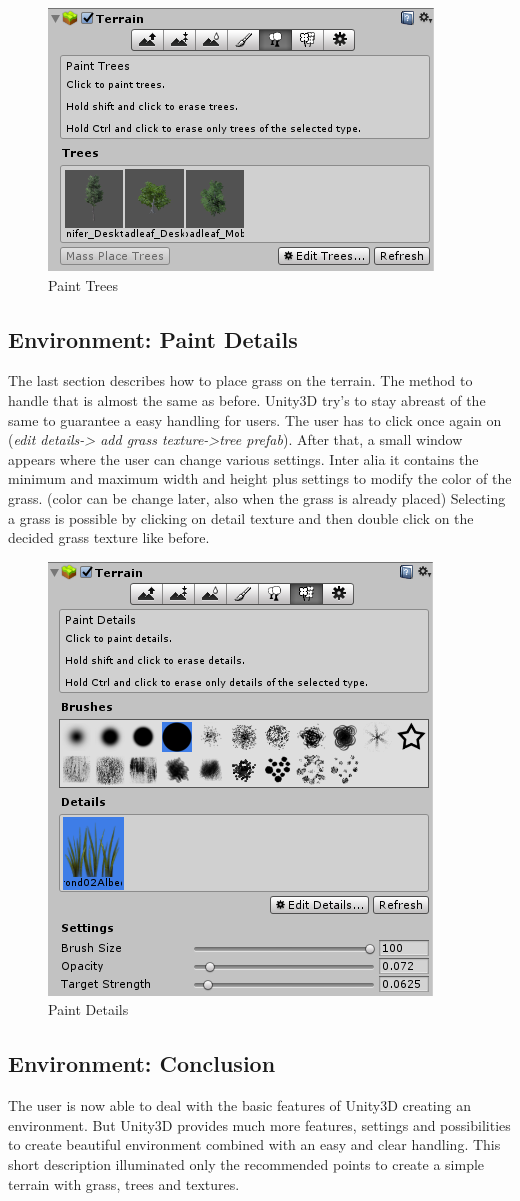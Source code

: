 \documentclass[conference]{IEEEtran}
\begin{document}
\begin{figure}[htbp]
  \includegraphics[width=.4\textwidth]{pictures/paint_trees}
  \caption{Paint Trees}
  \label{fig:paint_trees}
\end{figure}

\subsection{Environment: Paint Details}
The last section describes how to place grass on the terrain. The method to handle that is almost the same as before. Unity3D try’s to 
stay abreast of the same to guarantee a easy handling for users. The user has to click once again on (\emph{edit details-> add grass texture->tree prefab}). After that, a small window appears where the user can change various settings. Inter alia it contains the minimum and maximum width and height plus settings to modify the color of the grass. (color can be change later, also when the grass is already placed) Selecting a grass is possible by clicking on detail texture and then double click on the decided grass texture like before. 


\begin{figure}[htbp]
  \includegraphics[width=.4\textwidth]{pictures/paint_details}
  \caption{Paint Details}
  \label{fig:paint_details}
\end{figure}

\subsection{Environment: Conclusion}
The user is now able to deal with the basic features of Unity3D creating an environment. But Unity3D provides much more features, settings and possibilities to create beautiful environment combined with an easy and clear handling. This short description illuminated only the recommended points to create a simple terrain with grass, trees and textures.
\end{document}
